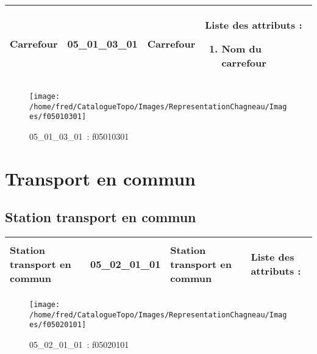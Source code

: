\documentclass[12pt,titlepage]{book}
\begin{document}
\renewcommand{\arraystretch}{1.2}
\begin{supertabular}{|p{10cm}|c|p{13cm}|p{12cm}|}
 Carrefour & 05\_01\_03\_01 & Carrefour & Liste des attributs :
\begin{enumerate}
  \item Nom du carrefour\end{enumerate}
\\
\hline
\end{supertabular}
\begin{figure}[h!]
  \hfill         %
  \begin{minipage}[t]{3cm}
    \begin{center}
      \texttt{[image: /home/fred/CatalogueTopo/Images/RepresentationChagneau/Images/f05010301]}
      \caption[~05\_01\_03\_01]{\small{05\_01\_03\_01~:} \tiny{f05010301}}\label{f05010301}
    \end{center}
  \end{minipage}
\end{figure}

\section{\large Transport en commun}
\subsection{Station transport en commun}
\noindent
\vspace{\baselineskip}

\renewcommand{\arraystretch}{1.2}
\begin{supertabular}{|p{10cm}|c|p{13cm}|p{12cm}|}
 Station transport en commun & 05\_02\_01\_01 & Station transport en commun & Liste des attributs :
\begin{enumerate}
\end{enumerate}
\\
\hline
\end{supertabular}
\begin{figure}[h!]
  \hfill         %
  \begin{minipage}[t]{3cm}
    \begin{center}
      \texttt{[image: /home/fred/CatalogueTopo/Images/RepresentationChagneau/Images/f05020101]}
      \caption[~05\_02\_01\_01]{\small{05\_02\_01\_01~:} \tiny{f05020101}}\label{f05020101}
    \end{center}
  \end{minipage}
\end{figure}
\end{document}

